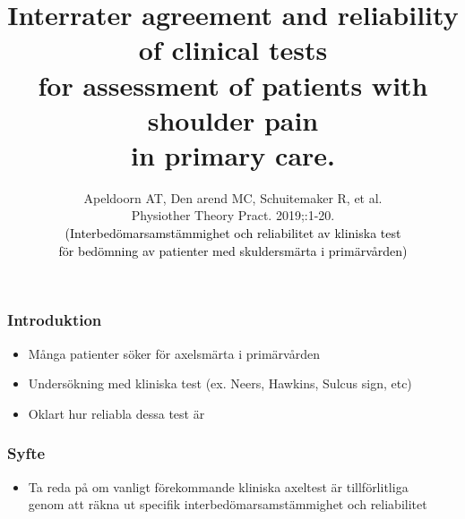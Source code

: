 \documentclass[aspectratio=169,12pt,handout,usenames,dvipsnames]{beamer}
\begin{document}
	\title{Interrater agreement and reliability of clinical tests\\ for assessment of patients with shoulder pain\\ in primary care.}
	\subtitle{Apeldoorn AT, Den arend MC, Schuitemaker R, et al. \\
			  Physiother Theory Pract. 2019;:1-20.\\[2em]
			  \textcolor{black}{(Interbedömarsamstämmighet och reliabilitet av kliniska test\\ 
			  för bedömning av patienter med skuldersmärta i primärvården)}}
	\date{}
	\frame[plain]{\vspace{2em}\maketitle} 

\begin{frame}
	\frametitle{Introduktion}
	\begin{itemize}
		\item Många patienter söker för axelsmärta i primärvården
		\item Undersökning med kliniska test (ex. Neers, Hawkins, Sulcus sign, etc)
		\item Oklart hur reliabla dessa test är
	\end{itemize}
\end{frame}

\begin{frame}
	\frametitle{Syfte}
	\begin{itemize}
		\item Ta reda på om vanligt förekommande kliniska axeltest är tillförlitliga\\
		genom att räkna ut specifik interbedömarsamstämmighet och reliabilitet
	\end{itemize}
\end{frame}
\end{document}

